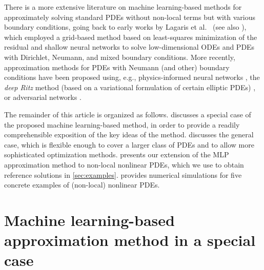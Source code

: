 There is a more extensive literature on machine learning-based methods for approximately solving standard PDEs without non-local terms but with various boundary conditions, going back to early works by Lagaris et al.~\citep{lagaris1998artificial,lagaris2000neural} (see also \citep{mcfall2009artificial}), which employed a grid-based method based on least-squares minimization of the residual and shallow neural networks to solve low-dimensional ODEs and PDEs with Dirichlet, Neumann, and mixed boundary conditions. More recently, approximation methods for PDEs with Neumann (and other) boundary conditions have been proposed using, e.g., physics-informed neural networks \citep{lu2021deepxde,sukumar2022exact,WangPerdikaris2020}, the \emph{deep Ritz} method (based on a variational formulation of certain elliptic PDEs) \citep{e2018deep,liao2021deep,chen2020comparison}, or adversarial networks \citep{zang2020weak}.

The remainder of this article is organized as follows.   discusses a special case of the proposed machine learning-based method, in order to provide a readily comprehensible exposition of the key ideas of the method.  discusses the general case, which is flexible enough to cover a larger class of PDEs and to allow more sophisticated optimization methods.  presents our extension of the MLP approximation method to non-local nonlinear PDEs, which we use to obtain reference solutions in \cref{sec:examples}.  provides numerical simulations for five concrete examples of (non-local) nonlinear PDEs.



\section{Machine learning-based approximation method in a special case}
\label{sec:derivation_spec}

